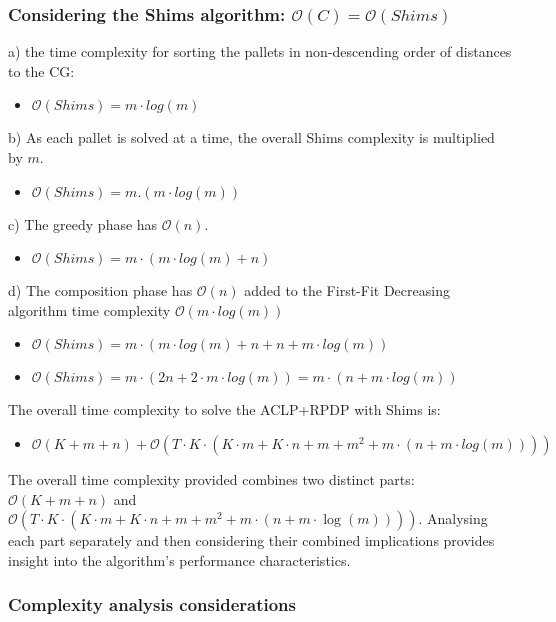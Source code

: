 \documentclass[preprint,authoryear]{elsarticle}
\begin{document}
{\subsubsection{Considering the Shims algorithm: $\mathcal{O}(C) = \mathcal{O}(Shims)$}

a) the time complexity for sorting the pallets in non-descending order of distances to the CG:
\begin{itemize}
	\item $\mathcal{O}(Shims) = m \cdot log(m)$
\end{itemize}

b) As each pallet is solved at a time, the overall Shims complexity is multiplied by $m$.
\begin{itemize}
	\item $\mathcal{O}(Shims) = m.(m \cdot log(m))$
\end{itemize}

c) The greedy phase has $\mathcal{O}(n)$.
\begin{itemize}
	\item $\mathcal{O}(Shims) = m \cdot (m \cdot log(m) + n)$
\end{itemize}

d) The composition phase has $\mathcal{O}(n)$ added to the First-Fit Decreasing algorithm time complexity $\mathcal{O}(m \cdot log(m))$
\begin{itemize}
	\item $\mathcal{O}(Shims) = m \cdot (m \cdot log(m) + n + n + m \cdot log(m))$
	\item $\mathcal{O}(Shims) = m \cdot (2n + 2 \cdot m \cdot log(m)) = m \cdot (n + m \cdot log(m))$
\end{itemize}

The overall time complexity to solve the ACLP+RPDP with Shims is:
\begin{itemize}
	\item $\mathcal{O}(K+m+n) + \mathcal{O}(T \cdot K \cdot (K \cdot m + K \cdot n + m + m^2 + m \cdot (n + m \cdot log(m))))$
\end{itemize}


The overall time complexity provided combines two distinct parts: $\mathcal{O}(K+m+n)$ and $\mathcal{O}(T \cdot K \cdot (K \cdot m + K \cdot n + m + m^2 + m \cdot (n + m \cdot \log(m))))$. Analysing each part separately and then considering their combined implications provides insight into the algorithm's performance characteristics.

\subsubsection{Complexity analysis considerations}

}
\end{document}
